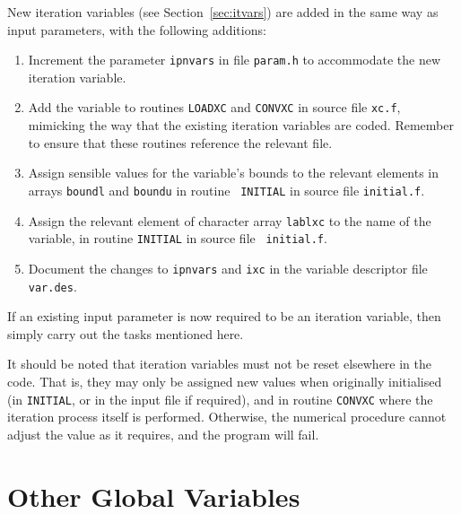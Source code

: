 New iteration variables (see Section~\ref{sec:itvars}) are added in the
same way as input parameters, with the following additions:
\begin{enumerate}
\item
Increment the parameter {\tt ipnvars} in \INCLUDE file {\tt param.h}
to accommodate the new iteration variable.
\item
Add the variable to routines {\tt LOADXC} and {\tt CONVXC} in source
file {\tt xc.f}, mimicking the way that the existing iteration
variables are coded. Remember to ensure that these routines reference
the relevant \INCLUDE file.
\item
Assign sensible values for the variable's bounds to the relevant
elements in arrays {\tt boundl} and {\tt boundu} in routine {\tt
INITIAL} in source file {\tt initial.f}.
\item
Assign the relevant element of character array {\tt lablxc} to the
name of the variable, in routine {\tt INITIAL} in source file {\tt
initial.f}.
\item
Document the changes to {\tt ipnvars} and {\tt ixc} in the variable
descriptor file {\tt var.des}.
\end{enumerate}
If an existing input parameter is now required to be an iteration
variable, then simply carry out the tasks mentioned here.

It should be noted that iteration variables must not be reset elsewhere in the
code. That is, they may only be assigned new values when originally
initialised (in {\tt INITIAL}, or in the input file if required), and in
routine {\tt CONVXC} where the iteration process itself is performed.
Otherwise, the numerical procedure cannot adjust the value as it requires, and
the program will fail.

\section{Other Global Variables}

